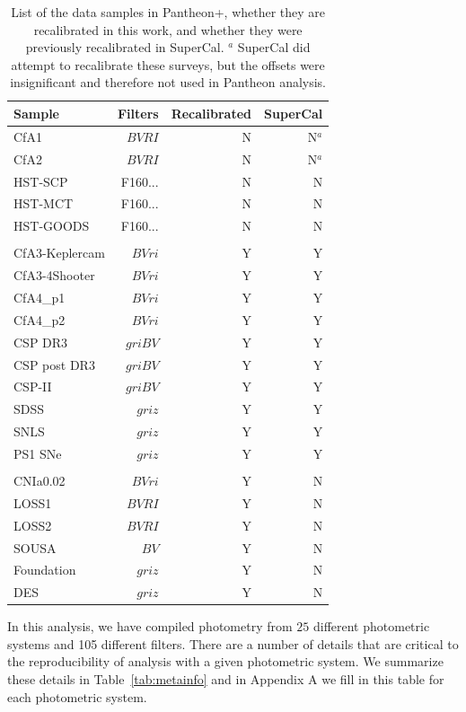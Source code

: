 \documentclass[twocolumn]{aastex63}
\begin{document}
\begin{table}
\centering
\begin{tabular}{l|rrr}
\toprule
Sample & Filters & Recalibrated & SuperCal \\
\hline
CfA1  & $BVRI$ & N & N$^{a}$ \\
CfA2  & $BVRI$ &N & N$^{a}$ \\
HST-SCP  & F160... & N & N \\
HST-MCT  &  F160... & N & N \\
HST-GOODS  & F160... & N & N\\
\\
CfA3-Keplercam  & $BVri$ &Y & Y \\
CfA3-4Shooter  &$BVri$ & Y & Y  \\
CfA4\_p1  &$BVri$ & Y & Y  \\
CfA4\_p2  &$BVri$ & Y & Y  \\
CSP DR3  &$griBV$ & Y & Y  \\
CSP post DR3  &$griBV$ & Y & Y  \\
CSP-II  &$griBV$ & Y & Y  \\
SDSS  &  $griz$ &Y & Y \\
SNLS  &  $griz$ &Y & Y \\
PS1 SNe  & $griz$ &  Y & Y \\
\\
CNIa0.02 &$BVri$ & Y & N  \\
LOSS1  &$BVRI$ & Y & N \\
LOSS2  &$BVRI$ & Y & N \\
SOUSA &$BV$ & Y & N \\Foundation  & $griz$ & Y & N \\
DES  & $griz$ & Y & N \\

\end{tabular}
\caption{List of the data samples in Pantheon+, whether they are recalibrated in this work, and whether they were previously recalibrated in SuperCal.\phantom{AAAAAAAAAAAAAA} $^a$ SuperCal did attempt to recalibrate these surveys, but the offsets were insignificant and therefore not used in Pantheon analysis.
}
\label{tab:summary}
\end{table}




In this analysis, we have compiled photometry from $25$ different photometric systems and 105 different filters.  
There are a number of details that are critical to the reproducibility of analysis with a given photometric system.  We summarize these details in Table~\ref{tab:metainfo} and in Appendix A we fill in this table for each photometric system.
\end{document}
